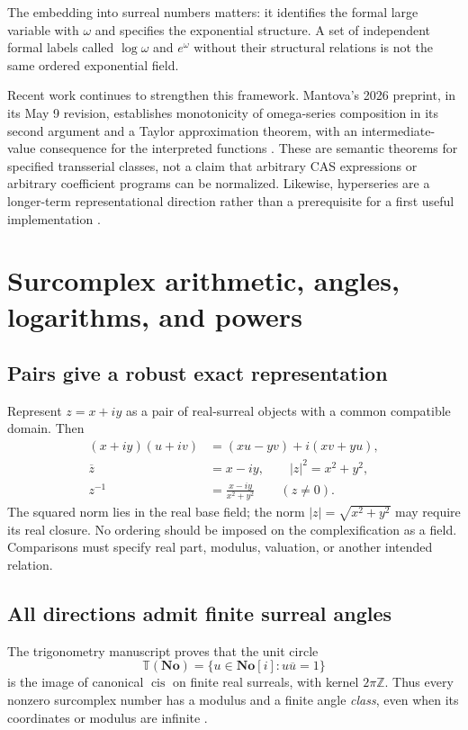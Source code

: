 \documentclass[11pt,letterpaper]{article}
\theoremstyle{definition}
\newcommand{\No}{\mathbf{No}}
\newcommand{\SC}{\mathbf{No}[i]}
\newcommand{\Z}{\mathbb Z}
\newcommand{\cis}{\operatorname{cis}}
\numberwithin{equation}{section}
\begin{document}
The embedding into surreal numbers matters: it identifies the formal large variable with $\omega$ and specifies the exponential structure. A set of independent formal labels called $\log\omega$ and $e^\omega$ without their structural relations is not the same ordered exponential field.

Recent work continues to strengthen this framework. Mantova's 2026 preprint, in its May 9 revision, establishes monotonicity of omega-series composition in its second argument and a Taylor approximation theorem, with an intermediate-value consequence for the interpreted functions \cite{Mantova2026}. These are semantic theorems for specified transserial classes, not a claim that arbitrary CAS expressions or arbitrary coefficient programs can be normalized. Likewise, hyperseries are a longer-term representational direction rather than a prerequisite for a first useful implementation \cite{Hyperseries}.

\section{Surcomplex arithmetic, angles, logarithms, and powers}\label{sec:complex}
\subsection{Pairs give a robust exact representation}
Represent $z=x+iy$ as a pair of real-surreal objects with a common compatible domain. Then
\begin{align*}
 (x+iy)(u+iv)&=(xu-yv)+i(xv+yu),\\
 \overline z&=x-iy,\qquad |z|^2=x^2+y^2,\\
 z^{-1}&=\frac{x-iy}{x^2+y^2}\qquad(z\ne0).
\end{align*}
The squared norm lies in the real base field; the norm $|z|=\sqrt{x^2+y^2}$ may require its real closure. No ordering should be imposed on the complexification as a field. Comparisons must specify real part, modulus, valuation, or another intended relation.

\subsection{All directions admit finite surreal angles}
The trigonometry manuscript proves that the unit circle
\[
 \mathbb T(\No)=\{u\in\SC:u\overline u=1\}
\]
is the image of canonical $\cis$ on finite real surreals, with kernel $2\pi\Z$. Thus every nonzero surcomplex number has a modulus and a finite angle \emph{class}, even when its coordinates or modulus are infinite \cite[``Polar decomposition and the angle group'']{SourceTrig}.
\end{document}

